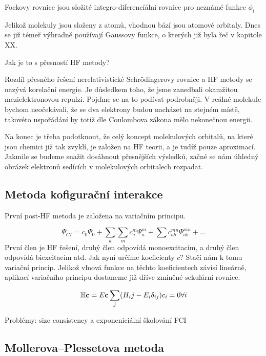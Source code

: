 Fockovy rovnice jsou složité integro-diferencíální rovnice pro neznámé funkce $\phi_i$

Jelikož molekuly jsou složeny z atomů, vhodnou bází jsou atomové orbitaly.
Dnes se již témeř výhradně používají Gaussovy funkce, o kterých již byla řeč v kapitole XX.


Jak je to s přesností HF metody?

Rozdíl přesného řešení nerelativistické Schr\"{o}dingerovy rovnice a HF metody se nazývá korelační energie. Je důsledkem toho, že jsme zanedbali okamžitou mezielektronovou repulzi. Pojďme se na to podívat podrobněji. V reálné molekule bychom neočekávali, že se dva elektrony budou nacházet na stejném místě, takovéto uspořádání by totiž dle Coulombova zákona mělo nekonečnou energii. 


Na konec je třeba podotknout, že celý koncept molekulových orbitalů, na které jsou chemici již tak zvyklí, je založen na HF teorii, a je tudíž pouze aproximací. Jakmile se budeme snažit dosáhnout přesnějších výsledků, začné se nám úhledný obrázek elektronů sedících v molekulových orbitalech rozpadat.

\subsection{Metoda kofigurační interakce}
První post-HF metoda je založena na variačním principu.



\begin{equation}
\Psi_{CI}=c_0\Psi_0+\sum_a\sum_m c_a^m\Psi_a^m+\sum c_{ab}^{mn}\Psi_{ab}^{mn}+\dots
\end{equation}
První člen je HF řešení, druhý člen odpovídá monoexcitacím, a druhý člen odpovídá biexcitacím atd.
Jak nyní určíme koeficienty $c$? Stačí nám k tomu variační princip. Jelikož vlnová funkce na těchto koeficientech závisí lineárně,
aplikací variačního principu dostaneme již dříve zmíněné sekulární rovnice.

\begin{equation}
\mathbb{H}\mathbf{c}=E\mathbf{c} \nonumber \\
\sum_j (H_ij-E_i\delta_{ij})c_i=0 \forall i 
\end{equation}

Problémy: size consistency a exponeniciální školování FCI

\subsection{Mollerova--Plessetova metoda}

